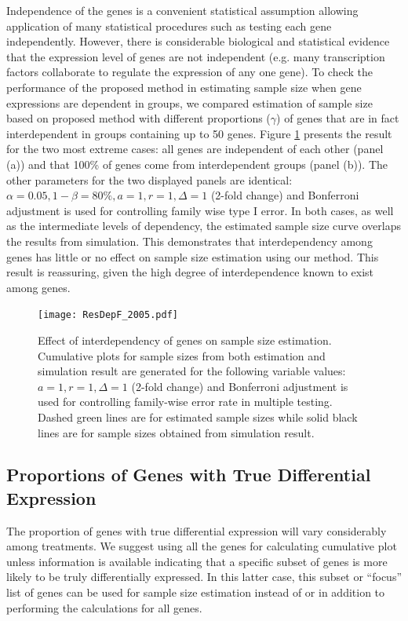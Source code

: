 \documentclass{bioinfo}
\begin{document}
Independence of the genes is a convenient statistical assumption
allowing application of many statistical procedures such as
testing each gene independently. However, there is considerable
biological and statistical evidence that the expression level of
genes are not independent (e.g. many transcription factors
collaborate to regulate the expression of any one gene). To check
the performance of the proposed method in estimating sample size
when gene expressions are dependent in groups, we compared
estimation of sample size based on proposed method with different
proportions ($\gamma$) of genes that are in fact interdependent in
groups containing up to 50 genes. Figure \ref{fig:ResDep} presents
the result for the two most extreme cases: all genes are
independent of each other (panel (a)) and that 100\% of genes come
from interdependent groups (panel (b)). The other parameters for
the two displayed panels are identical: $\alpha = 0.05, 1 - \beta
= 80\%, a = 1, r = 1, \Delta = 1$ (2-fold change) and Bonferroni
adjustment is used for controlling family wise type I error. In
both cases, as well as the intermediate levels of dependency, the
estimated sample size curve overlaps the results from simulation.
This demonstrates that interdependency among genes has little or
no effect on sample size estimation using our method. This result
is reassuring, given the high degree of interdependence known to
exist among genes.

\begin{figure}[h]
  \centerline{\texttt{[image: ResDepF\_2005.pdf]}}
  \caption[Effect of interdependency of genes on sample size estimation]
  {Effect of interdependency of genes on sample size estimation.
    Cumulative plots for sample sizes from both estimation and simulation result
    are generated for the following variable values: $a = 1, r = 1, \Delta = 1$ (2-fold
    change) and Bonferroni adjustment is used for controlling family-wise error rate in multiple testing. Dashed green lines are for estimated sample sizes
    while solid black lines are for sample sizes obtained from simulation result.}
  \label{fig:ResDep}
\end{figure}

\subsection{Proportions of Genes with True Differential Expression}

The proportion of genes with true differential expression will
vary considerably among treatments. We suggest using all the genes
for calculating cumulative plot unless information is available
indicating that a specific subset of genes is more likely to be
truly differentially expressed. In this latter case, this subset
or ``focus'' list of genes can be used for sample size estimation
instead of or in addition to performing the calculations for all
genes.
\end{document}
